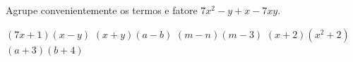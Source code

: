 Agrupe convenientemente os termos e fatore $7x^2-y+x-7xy$.

$(7x+1)(x-y)$
$(x+y)(a-b)$
$(m-n)(m-3)$
$(x+2)(x^2+2)$
$(a+3)(b+4)$



